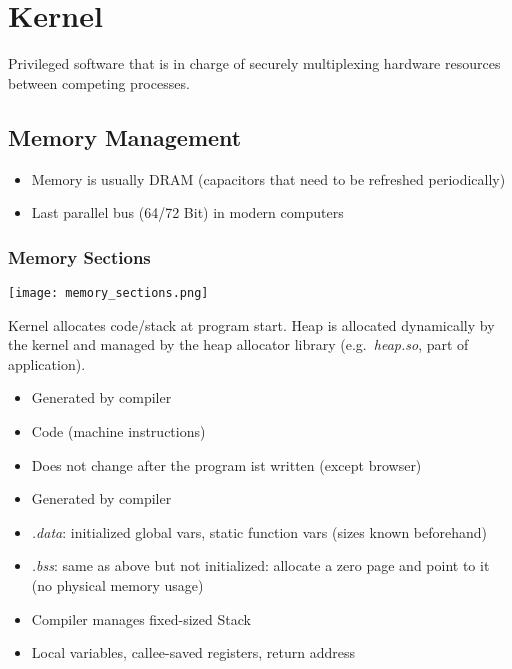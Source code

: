 \section{Kernel}
Privileged software that is in charge of securely multiplexing hardware resources between competing processes.

\subsection{Memory Management}
\begin{itemize}
    \item Memory is usually DRAM (capacitors that need to be refreshed periodically)
    \item Last parallel bus (64/72 Bit) in modern computers
\end{itemize}


\subsubsection{Memory Sections}
\texttt{[image: memory\_sections.png]}

Kernel allocates code/stack at program start. Heap is allocated dynamically by the kernel and managed by the heap allocator library (e.g.\ \textit{heap.so}, part of application).


\begin{itemize}
    \item Generated by compiler
    \item Code (machine instructions)
    \item Does not change after the program ist written (except browser)
\end{itemize}



\begin{itemize}
    \item Generated by compiler
    \item \textit{.data}: initialized global vars, static function vars (sizes known beforehand)
    \item \textit{.bss}: same as above but not initialized: allocate a zero page and point to it (no physical memory usage)
\end{itemize}


\begin{itemize}
    \item Compiler manages fixed-sized Stack
    \item Local variables, callee-saved registers, return address
\end{itemize}

